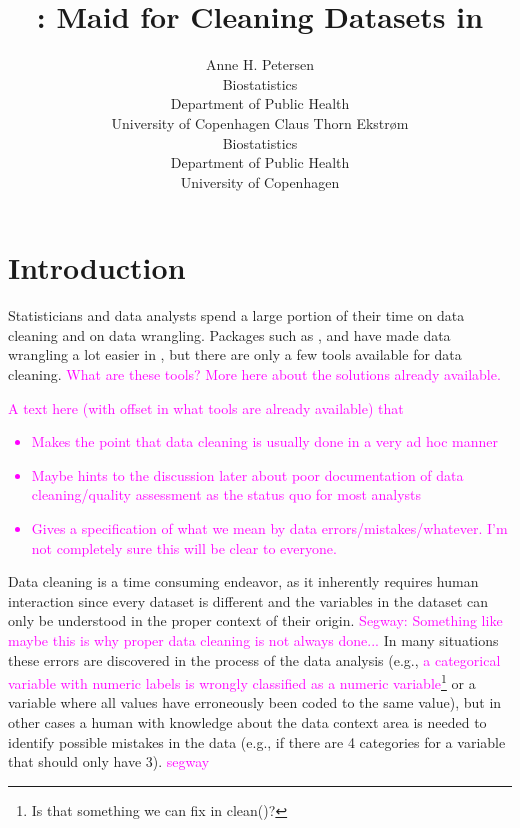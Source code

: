 \documentclass[article]{jss}
\author{Anne H. Petersen\\Biostatistics\\Department of Public
  Health\\University of Copenhagen \And Claus Thorn Ekstr\o m\\Biostatistics\\Department of Public
  Health\\University of Copenhagen}
\title{\pkg{cleanR}: Maid for Cleaning Datasets in \proglang{R}}
\newcommand{\hl}[1]{\textcolor{magenta}{#1}}
\begin{document}
\section{Introduction}
Statisticians and data analysts spend a large portion of their time on
data cleaning and on data wrangling. Packages such as
, and  have made data wrangling a lot easier in
, but there are only a few tools available for data cleaning. \hl{What are these tools? More here about the solutions already available.}

\hl{A text here (with offset in what tools are already available) that
\begin{itemize}
\item Makes the point that data cleaning is usually done in a very ad hoc manner
\item Maybe hints to the discussion later about poor documentation of data cleaning/quality assessment as the status quo for most analysts
\item Gives a specification of what we mean by data errors/mistakes/whatever. I'm not completely sure this will be clear to everyone.
\end{itemize}
}

Data cleaning is a time consuming endeavor, as it inherently requires
human interaction since every dataset is different and the variables
in the dataset can only be understood in the proper context of their origin. 
\hl{Segway: Something like maybe this is why proper data cleaning is not always done...}
In many situations these errors are discovered in the process of the
data analysis (e.g., \hl{a categorical variable with numeric labels is
wrongly classified as a numeric variable\footnote{Is that something we can fix in clean()?}} or a variable where all values have erroneously been coded to the same value), but in other cases a human
with knowledge about the data context area is needed to identify
possible mistakes in the data (e.g., if there are 4 categories for a
variable that should only have 3).  \hl{segway} \\
\end{document}
